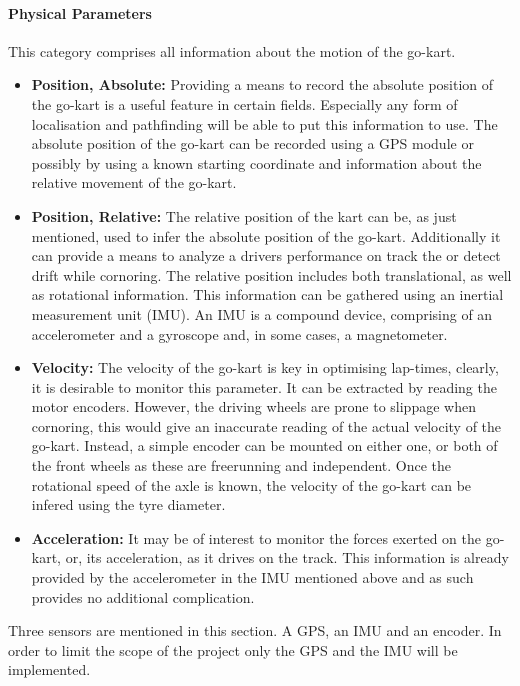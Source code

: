 \paragraph*{Physical Parameters}
This category comprises all information about the motion of the go-kart.
\begin{itemize}
	\item \textbf{Position, Absolute:} Providing a means to record the absolute position of the go-kart is a useful feature in certain fields.
	Especially any form of localisation and pathfinding will be able to put this information to use.
	The absolute position of the go-kart can be recorded using a GPS module or possibly by using a known starting coordinate and information about the relative movement of the go-kart.
	\item \textbf{Position, Relative:} The relative position of the kart can be, as just mentioned, used to infer the absolute position of the go-kart.
	Additionally it can provide a means to analyze a drivers performance on track the or detect drift while cornoring.
	The relative position includes both translational, as well as rotational information.
	This information can be gathered using an inertial measurement unit (IMU).
	An IMU is a compound device, comprising of an accelerometer and a gyroscope and, in some cases, a magnetometer.
	\item \textbf{Velocity:} The velocity of the go-kart is key in optimising lap-times, clearly, it is desirable to monitor this parameter.
	It can be extracted by reading the motor encoders.
	However, the driving wheels are prone to slippage when cornoring, this would give an inaccurate reading of the actual velocity of the go-kart.
	Instead, a simple encoder can be mounted on either one, or both of the front wheels as these are freerunning and independent.
	Once the rotational speed of the axle is known, the velocity of the go-kart can be infered using the tyre diameter.
	\item \textbf{Acceleration:} It may be of interest to monitor the forces exerted on the go-kart, or, its acceleration, as it drives on the track.
	This information is already provided by the accelerometer in the IMU mentioned above and as such provides no additional complication.
\end{itemize}
Three sensors are mentioned in this section.
A GPS, an IMU and an encoder.
In order to limit the scope of the project only the GPS and the IMU will be implemented.
